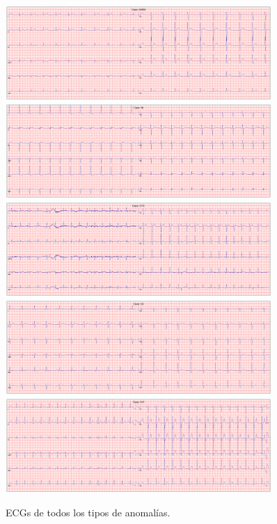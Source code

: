 	 \begin{figure}
	 	\includegraphics[width=0.9\textwidth]{Imagenes/Vectorial/ECG/NORM.png}
	 	\includegraphics[width=0.9\textwidth]{Imagenes/Vectorial/ECG/MI.png}
	 	\includegraphics[width=0.9\textwidth]{Imagenes/Vectorial/ECG/STTC.png}
	 	\includegraphics[width=0.9\textwidth]{Imagenes/Vectorial/ECG/CD.png}
	 	\includegraphics[width=0.9\textwidth]{Imagenes/Vectorial/ECG/HYP.png}
	 	\caption{ECGs de todos los tipos de anomalías.}
	 	\label{fig:ecg_clases}
	 \end{figure}
	
